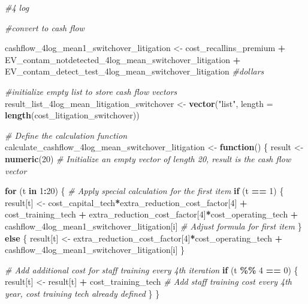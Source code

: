 \documentclass[
]{article}
\newenvironment{Shaded}{\begin{snugshade}}{\end{snugshade}}
\newcommand{\AttributeTok}[1]{\textcolor[rgb]{0.13,0.29,0.53}{#1}}
\newcommand{\CommentTok}[1]{\textcolor[rgb]{0.56,0.35,0.01}{\textit{#1}}}
\newcommand{\ControlFlowTok}[1]{\textcolor[rgb]{0.13,0.29,0.53}{\textbf{#1}}}
\newcommand{\DecValTok}[1]{\textcolor[rgb]{0.00,0.00,0.81}{#1}}
\newcommand{\FunctionTok}[1]{\textcolor[rgb]{0.13,0.29,0.53}{\textbf{#1}}}
\newcommand{\NormalTok}[1]{#1}
\newcommand{\OtherTok}[1]{\textcolor[rgb]{0.56,0.35,0.01}{#1}}
\newcommand{\SpecialCharTok}[1]{\textcolor[rgb]{0.81,0.36,0.00}{\textbf{#1}}}
\newcommand{\StringTok}[1]{\textcolor[rgb]{0.31,0.60,0.02}{#1}}
\begin{document}
\begin{Shaded}
\begin{Highlighting}[]
\CommentTok{\#4 log}

\CommentTok{\#convert to cash flow}

\NormalTok{cashflow\_4log\_mean1\_switchover\_litigation }\OtherTok{\textless{}{-}}\NormalTok{ cost\_recallins\_premium }\SpecialCharTok{+}\NormalTok{ EV\_contam\_notdetected\_4log\_mean\_switchover\_litigation }\SpecialCharTok{+}\NormalTok{ EV\_contam\_detect\_test\_4log\_mean\_switchover\_litigation }\CommentTok{\#dollars}

\CommentTok{\#initialize empty list to store cash flow vectors}
\NormalTok{result\_list\_4log\_mean\_litigation\_switchover }\OtherTok{\textless{}{-}} \FunctionTok{vector}\NormalTok{(}\StringTok{"list"}\NormalTok{, }\AttributeTok{length =} \FunctionTok{length}\NormalTok{(cost\_litigation\_switchover))}


\CommentTok{\# Define the calculation function}
\NormalTok{calculate\_cashflow\_4log\_mean\_switchover\_litigation }\OtherTok{\textless{}{-}} \ControlFlowTok{function}\NormalTok{() \{}
\NormalTok{  result }\OtherTok{\textless{}{-}} \FunctionTok{numeric}\NormalTok{(}\DecValTok{20}\NormalTok{)  }\CommentTok{\# Initialize an empty vector of length 20, result is the cash flow vector}
  
  \ControlFlowTok{for}\NormalTok{ (t }\ControlFlowTok{in} \DecValTok{1}\SpecialCharTok{:}\DecValTok{20}\NormalTok{) \{}
    \CommentTok{\# Apply special calculation for the first item}
    \ControlFlowTok{if}\NormalTok{ (t }\SpecialCharTok{==} \DecValTok{1}\NormalTok{) \{}
\NormalTok{      result[t] }\OtherTok{\textless{}{-}}\NormalTok{ cost\_capital\_tech}\SpecialCharTok{*}\NormalTok{extra\_reduction\_cost\_factor[}\DecValTok{4}\NormalTok{] }\SpecialCharTok{+}\NormalTok{ cost\_training\_tech }\SpecialCharTok{+}\NormalTok{ extra\_reduction\_cost\_factor[}\DecValTok{4}\NormalTok{]}\SpecialCharTok{*}\NormalTok{cost\_operating\_tech }\SpecialCharTok{+}\NormalTok{ cashflow\_4log\_mean1\_switchover\_litigation[i] }\CommentTok{\# Adjust formula for first item}
\NormalTok{    \} }\ControlFlowTok{else}\NormalTok{ \{}
\NormalTok{      result[t] }\OtherTok{\textless{}{-}}\NormalTok{ extra\_reduction\_cost\_factor[}\DecValTok{4}\NormalTok{]}\SpecialCharTok{*}\NormalTok{cost\_operating\_tech }\SpecialCharTok{+}\NormalTok{ cashflow\_4log\_mean1\_switchover\_litigation[i]}
\NormalTok{    \}}
    
    \CommentTok{\# Add additional cost for staff training every 4th iteration}
    \ControlFlowTok{if}\NormalTok{ (t }\SpecialCharTok{\%\%} \DecValTok{4} \SpecialCharTok{==} \DecValTok{0}\NormalTok{) \{}
\NormalTok{      result[t] }\OtherTok{\textless{}{-}}\NormalTok{ result[t] }\SpecialCharTok{+}\NormalTok{ cost\_training\_tech  }\CommentTok{\# Add staff training cost every 4th year, cost training tech already defined}
\NormalTok{    \}}
\NormalTok{  \}}
  

\end{Highlighting}
\end{Shaded}
\end{document}
